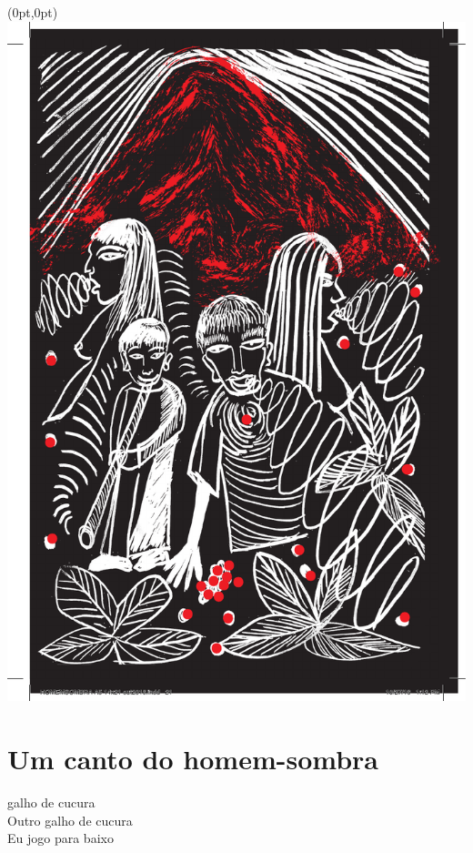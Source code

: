 \begin{textblock*}{8in}(0pt,0pt)%
\vspace*{-2.8cm}
\hspace*{-3.2cm}\includegraphics[width=153mm]{./imgs/img9.pdf}
\end{textblock*}

\endgroup

\chapter{Um canto do homem-sombra}

 galho de cucura\\
Outro galho de cucura\\
Eu jogo para baixo

